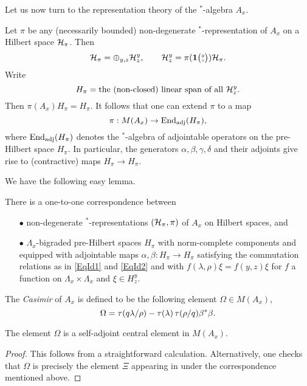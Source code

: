 Let us now turn to the representation theory of the $^*$-algebra $A_x$.

Let $\pi$ be any (necessarily bounded) non-degenerate $^*$-representation of $A_x$ on a Hilbert space $\mathcal{H}_{\pi}$. Then \[\mathcal{H}_{\pi} = \oplus_{y,z} \mathcal{H}^{y}_{z},\qquad \mathcal{H}^{y}_{z} = \pi(\mathbf{1}{\tiny {\begin{pmatrix} y\\z\end{pmatrix}}})\mathcal{H}_{\pi}.\] Write \[H_{\pi} =  \textrm{the (non-closed) linear span of all }\mathcal{H}^{y}_{z}.\] Then $\pi(A_x)H_{\pi} = H_{\pi}$. It follows that one can extend $\pi$ to a map \[\pi: M(A_x) \rightarrow \operatorname{\mathrm{End}}_{\operatorname{\mathrm{adj}}}(H_{\pi}),\] where $\operatorname{\mathrm{End}}_{\operatorname{\mathrm{adj}}}(H_{\pi})$ denotes the $^*$-algebra of adjointable operators on the pre-Hilbert space $H_{\pi}$. In particular, the generators $\alpha,\beta,\gamma,\delta$ and their adjoints give rise to (contractive) maps $H_{\pi}\rightarrow H_{\pi}$. 

We have the following easy lemma.

\begin{Lem} There is a one-to-one correspondence between\begin{itemize}\item[$\bullet$] non-degenerate $^*$-representations $(\mathcal{H}_{\pi},\pi)$ of $A_x$ on Hilbert spaces, and 
\item[$\bullet$] $\Lambda_x$-bigraded pre-Hilbert spaces $H_{\pi}$ with norm-complete components and equipped with adjointable maps $\alpha,\beta:H_{\pi}\rightarrow H_{\pi}$ satisfying the commutation relations as in \eqref{EqId1} and \eqref{EqId2} and with $f(\lambda,\rho)\xi = f(y,z)\xi$ for $f$ a function on $\Lambda_x\times \Lambda_x$ and $\xi\in H^y_z$.
\end{itemize}
\end{Lem}

\begin{Def} The \emph{Casimir} of $A_x$ is defined to be the following element $\Omega\in M(A_x)$, \[\Omega = \operatorname{\tau}(q\lambda/\rho) - \operatorname{\tau}(\lambda)\operatorname{\tau}(\rho/q)\beta^*\beta.\]  
\end{Def}

\begin{Lem} The element $\Omega$ is a self-adjoint central element in $M(A_x)$.
\end{Lem}
\begin{proof}
This follows from a straightforward calculation. Alternatively, one checks that $\Omega$ is precisely the element $\Xi$ appearing in \cite[Lemma 3.3]{KoR1} under the correspondence mentioned above. 
\end{proof}

